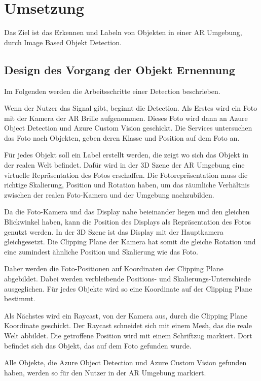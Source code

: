 \newpage
\section{Umsetzung}

Das Ziel ist das Erkennen und Labeln von Objekten in einer AR Umgebung, durch Image Based Objekt Detection.

\subsection{Design des Vorgang der Objekt Ernennung}

Im Folgenden werden die Arbeitsschritte einer Detection beschrieben.

Wenn der Nutzer das Signal gibt, beginnt die Detection. Als Erstes wird ein Foto mit der Kamera der AR Brille aufgenommen. 
Dieses Foto wird dann an Azure Object Detection und Azure Custom Vision geschickt. 
Die Services untersuchen das Foto nach Objekten, geben deren Klasse und Position auf dem Foto an.

Für jedes Objekt soll ein Label erstellt werden, die zeigt wo sich das Objekt in der realen Welt befindet.
Dafür wird in der 3D Szene der AR Umgebung eine virtuelle Repräsentation des Fotos erschaffen. Die Fotorepräsentation muss die richtige Skalierung, Position und Rotation haben, um das räumliche Verhältnis zwischen der realen Foto-Kamera und der Umgebung nachzubilden.

Da die Foto-Kamera und das Display nahe beieinander liegen und den gleichen Blickwinkel haben, kann die Position des Displays als Repräsentation des Fotos genutzt werden. In der 3D Szene ist das Display mit der Hauptkamera gleichgesetzt. Die Clipping Plane der Kamera hat somit die gleiche Rotation und eine zumindest ähnliche Position und Skalierung wie das Foto. 

Daher werden die Foto-Positionen auf Koordinaten der Clipping Plane abgebildet. Dabei werden verbleibende Positions- und Skalierungs-Unterschiede ausgeglichen. Für jedes Objekte wird so eine Koordinate auf der Clipping Plane bestimmt. 

Als Nächstes wird ein Raycast, von der Kamera aus, durch die Clipping Plane Koordinate geschickt. Der Raycast schneidet sich mit einem Mesh, das die reale Welt abbildet. Die getroffene Position wird mit einem Schriftzug markiert. Dort befindet sich das Objekt, das auf dem Foto gefunden wurde.

Alle Objekte, die Azure Object Detection und Azure Custom Vision gefunden haben, werden so für den Nutzer in der AR Umgebung markiert.


